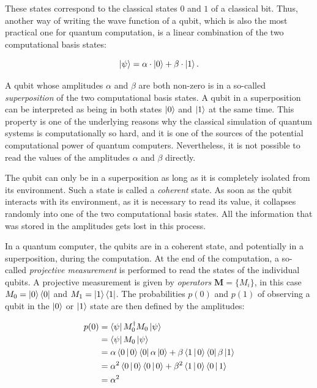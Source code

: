 These states correspond to the classical states $0$ and $1$ of a classical bit. Thus, another way of writing the wave
function of a qubit, which is also the most practical one for quantum computation, is a linear combination of the
two computational basis states:

\begin{equation}
  \Ket{\psi} = \alpha \cdot \Ket{0} + \beta \cdot \Ket{1}.
\end{equation}

A qubit whose amplitudes $\alpha$ and $\beta$ are both non-zero is in a so-called \textit{superposition} of the two
computational basis states. A qubit in a superposition can be interpreted as being in both states $\Ket{0}$ and $\Ket{1}$ at the same time.
This property is one of the underlying reasons why the classical simulation of
quantum systems is computationally so hard, and it is one of the sources of the potential computational power of quantum computers.
Nevertheless, it is not possible to read the values of the amplitudes $\alpha$ and $\beta$
directly.

The qubit can only be in a superposition as long as it is completely isolated
from its environment. Such a state is called a \textit{coherent} state. As
soon as the qubit interacts with its environment, as it is necessary to read
its value, it collapses randomly into one of the two computational basis
states. All the information that was stored in the amplitudes gets lost in this process.

In a quantum computer, the qubits are in a coherent state, and potentially in a superposition, during the computation. At the end of the computation, a so-called
\textit{projective measurement} is performed to read the states of the individual qubits. A projective measurement is given
by \textit{operators} $\textbf{M} = \{M_i\}$, in this case $M_0 = \Ket{0}\Bra{0}$ and $M_1 = \Ket{1}\Bra{1}$. The probabilities $p(0)$ and $p(1)$ of observing a qubit in the $\Ket{0}$ or
$\Ket{1}$ state are then defined by the amplitudes:

\begin{align}
  p(0) &= \Bra{\psi} M_0^{\dagger}M_0 \Ket{\psi} \\
       &=  \Bra{\psi} M_0 \Ket{\psi} \\
       &= \alpha \Braket{0|0} \Bra{0} \alpha \Ket{0} + \beta \Braket{1|0} \Bra{0} \beta \Ket{1} \\
       &= \alpha^2 \Braket{0|0} \Braket{0|0} + \beta^2 \Braket{1|0} \Braket{0|1} \\
       &= \alpha^2
\end{align}

